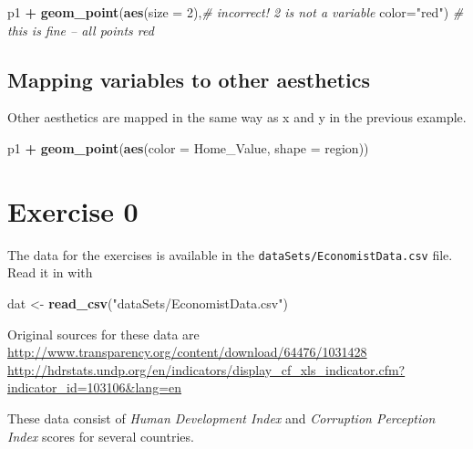 \documentclass[]{book}
\newenvironment{Shaded}{\begin{snugshade}}{\end{snugshade}}
\newcommand{\KeywordTok}[1]{\textcolor[rgb]{0.13,0.29,0.53}{\textbf{#1}}}
\newcommand{\DataTypeTok}[1]{\textcolor[rgb]{0.13,0.29,0.53}{#1}}
\newcommand{\DecValTok}[1]{\textcolor[rgb]{0.00,0.00,0.81}{#1}}
\newcommand{\StringTok}[1]{\textcolor[rgb]{0.31,0.60,0.02}{#1}}
\newcommand{\CommentTok}[1]{\textcolor[rgb]{0.56,0.35,0.01}{\textit{#1}}}
\newcommand{\OperatorTok}[1]{\textcolor[rgb]{0.81,0.36,0.00}{\textbf{#1}}}
\newcommand{\NormalTok}[1]{#1}
\begin{document}
\begin{Shaded}
\begin{Highlighting}[]
\NormalTok{p1 }\OperatorTok{+}
\StringTok{  }\KeywordTok{geom_point}\NormalTok{(}\KeywordTok{aes}\NormalTok{(}\DataTypeTok{size =} \DecValTok{2}\NormalTok{),}\CommentTok{# incorrect! 2 is not a variable}
             \DataTypeTok{color=}\StringTok{"red"}\NormalTok{) }\CommentTok{# this is fine -- all points red}
\end{Highlighting}
\end{Shaded}

\subsection{Mapping variables to other
aesthetics}\label{mapping-variables-to-other-aesthetics}

Other aesthetics are mapped in the same way as x and y in the previous
example.

\begin{Shaded}
\begin{Highlighting}[]
\NormalTok{p1 }\OperatorTok{+}
\StringTok{  }\KeywordTok{geom_point}\NormalTok{(}\KeywordTok{aes}\NormalTok{(}\DataTypeTok{color =}\NormalTok{ Home_Value, }\DataTypeTok{shape =}\NormalTok{ region))}
\end{Highlighting}
\end{Shaded}

\section{Exercise 0}\label{exercise-0-2}

The data for the exercises is available in the
\texttt{dataSets/EconomistData.csv} file. Read it in with

\begin{Shaded}
\begin{Highlighting}[]
\NormalTok{dat <-}\StringTok{ }\KeywordTok{read_csv}\NormalTok{(}\StringTok{"dataSets/EconomistData.csv"}\NormalTok{)}
\end{Highlighting}
\end{Shaded}

Original sources for these data are
\url{http://www.transparency.org/content/download/64476/1031428}
\url{http://hdrstats.undp.org/en/indicators/display_cf_xls_indicator.cfm?indicator_id=103106\&lang=en}

These data consist of \emph{Human Development Index} and
\emph{Corruption Perception Index} scores for several countries.
\end{document}
